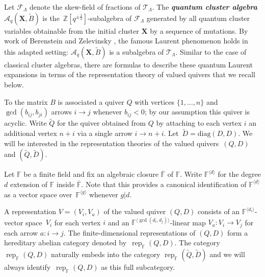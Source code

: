 \documentclass[pdftex]{sigma}
\newcommand{\bfX}{\mathbf{X}}
\newcommand{\cA}{\mathcal{A}}
\newcommand{\cF}{\mathcal{F}}
\newcommand{\cT}{\mathcal{T}}
\newcommand{\FF}{\mathbb{F}}
\newcommand{\half}{{\frac{1}{2}}}
\newcommand{\rep}{\operatorname{rep}}
\newcommand{\ZZ}{\mathbb{Z}}
\newcommand{\newword}[1]{\textbf{\emph{#1}}}
\begin{document}
  Let $\cF_\Lambda$ denote the skew-field of fractions of $\cT_\Lambda$.
  The \newword{quantum cluster algebra} $\cA_q(\bfX,\widetilde{B})$ is the~$\ZZ[q^{\pm\half}]$-subalgebra of $\cF_\Lambda$ generated by all quantum cluster variables obtainable from the initial cluster $\bfX$ by a sequence of mutations.
  By work of Berenstein and Zelevinsky \cite{berenstein-zelevinsky}, the famous Laurent phenomenon holds in this adapted setting: $\cA_q(\bfX,\widetilde{B})$ is a subalgebra of $\cT_\Lambda$.
  Similar to the case of classical cluster algebras, there are formulas to describe these quantum Laurent expansions in terms of the representation theory of valued quivers that we recall below.

  To the matrix $B$ is associated a quiver $Q$ with vertices $\{1,\ldots,n\}$ and $\gcd(b_{ij},b_{ji})$ arrows $i\to j$ whenever $b_{ij}<0$; by our assumption this quiver is acyclic.
  Write $\widetilde{Q}$ for the quiver obtained from $Q$ by attaching to each vertex $i$ an additional vertex $n+i$ via a single arrow $i\to n+i$. 
  Let~$\widetilde{D}=\mathrm{diag}(D,D)$.
  We will be interested in the representation theories of the valued quivers~$(Q,D)$ and  $(\widetilde{Q},\widetilde{D})$.

  Let $\FF$ be a finite field and fix an algebraic closure $\overline{\FF}$ of $\FF$.  
  Write $\FF^{\langle d\rangle}$ for the degree $d$ extension of $\FF$ inside $\overline{\FF}$.
  Note that this provides a canonical identification of $\FF^{\langle d\rangle}$ as a vector space over~$\FF^{\langle g\rangle}$ whenever $g|d$.  
  
  A representation $V=(V_i,V_a)$ of the valued quiver $(Q,D)$ consists of an $\FF^{\langle d_i\rangle}$-vector space~$V_i$ for each vertex $i$ and an $\FF^{\langle\gcd(d_i,d_j)\rangle}$-linear map $V_a:V_i\to V_j$ for each arrow $a:i\to j$.  
  The finite-dimensional representations of $(Q,D)$ form a hereditary abelian category denoted by~$\rep_\FF(Q,D)$.  
  The category $\rep_\FF(Q,D)$ naturally embeds into the category $\rep_\FF(\widetilde{Q},\widetilde{D})$ and we will always identify~$\rep_\FF(Q,D)$ as this full subcategory.
\end{document}
